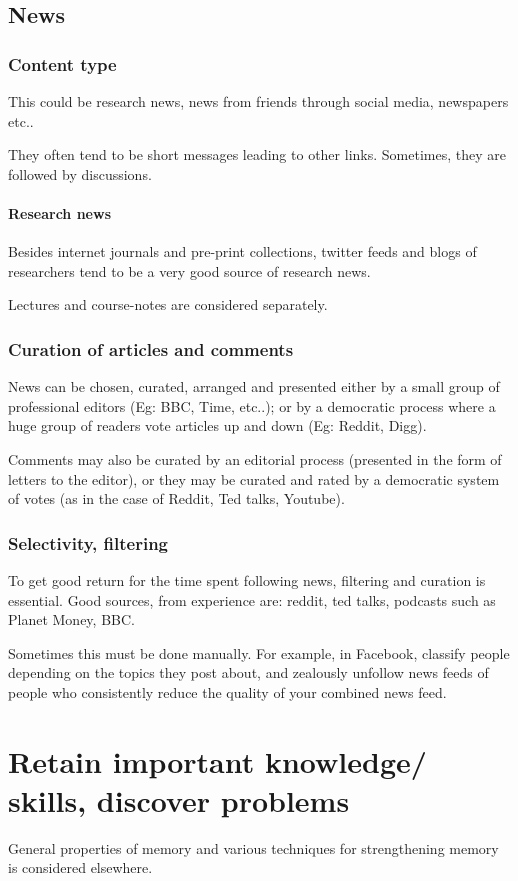 \documentclass[oneside, article]{memoir}
\begin{document}
\section{News}
\subsection{Content type}
This could be research news, news from friends through social media, newspapers etc..

They often tend to be short messages leading to other links. Sometimes, they are followed by discussions.

\subsubsection{Research news}
Besides internet journals and pre-print collections, twitter feeds and blogs of researchers tend to be a very good source of research news.

Lectures and course-notes are considered separately.

\subsection{Curation of articles and comments}
News can be chosen, curated, arranged and presented either by a small group of professional editors (Eg: BBC, Time, etc..); or by a democratic process where a huge group of readers vote articles up and down (Eg: Reddit, Digg).

Comments may also be curated by an editorial process (presented in the form of letters to the editor), or they may be curated and rated by a democratic system of votes (as in the case of Reddit, Ted talks, Youtube).

\subsection{Selectivity, filtering}
To get good return for the time spent following news, filtering and curation is essential. Good sources, from experience are: reddit, ted talks, podcasts such as Planet Money, BBC.

Sometimes this must be done manually. For example, in Facebook, classify people depending on the topics they post about, and zealously unfollow news feeds of people who consistently reduce the quality of your combined news feed.

\chapter{Retain important knowledge/ skills, discover problems}
General properties of memory and various techniques for strengthening memory is considered elsewhere.
\end{document}
